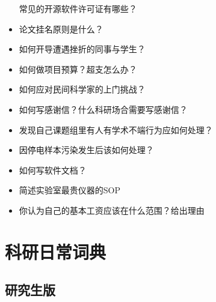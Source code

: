 \documentclass[]{tufte-book}
\begin{document}
\begin{itemize}
  常见的开源软件许可证有哪些？
\item
  论文挂名原则是什么？
\item
  如何开导遭遇挫折的同事与学生？
\item
  如何做项目预算？超支怎么办？
\item
  如何应对民间科学家的上门挑战？
\item
  如何写感谢信？什么科研场合需要写感谢信？
\item
  发现自己课题组里有人有学术不端行为应如何处理？
\item
  因停电样本污染发生后该如何处理？
\item
  如何写软件文档？
\item
  简述实验室最贵仪器的SOP
\item
  你认为自己的基本工资应该在什么范围？给出理由
\end{itemize}

\hypertarget{ux79d1ux7814ux65e5ux5e38ux8bcdux5178}{%
\section*{科研日常词典}\label{ux79d1ux7814ux65e5ux5e38ux8bcdux5178}}

\hypertarget{ux7814ux7a76ux751fux7248}{%
\subsection*{研究生版}\label{ux7814ux7a76ux751fux7248}}
\end{document}
